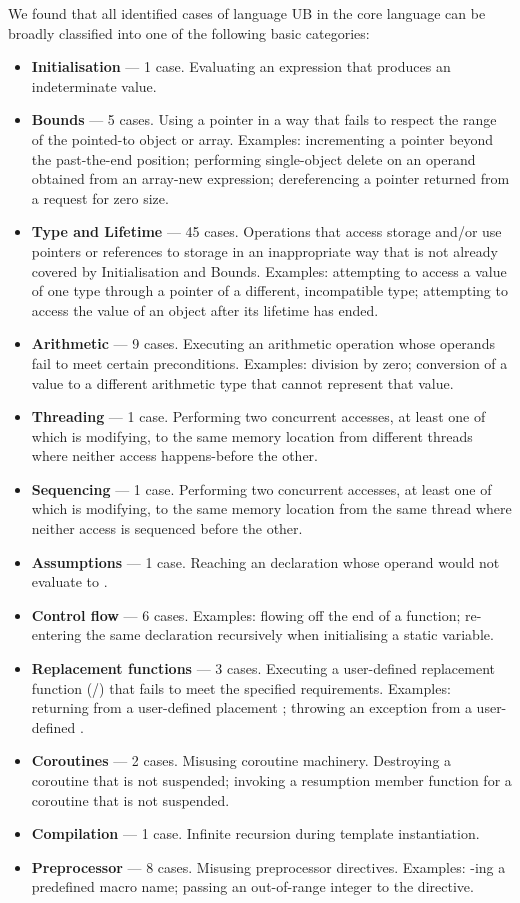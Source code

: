 We found that all identified cases of language UB in the core language can be broadly classified into one of the following basic categories:
\begin{itemize}
\item \textbf{Initialisation} --- 1 case. Evaluating an expression that produces an indeterminate value.
\item \textbf{Bounds} --- 5 cases. Using a pointer in a way that fails to respect the range of the pointed-to object or array. Examples: incrementing a pointer beyond the past-the-end position; performing single-object delete on an operand obtained from an array-new expression;  dereferencing a pointer returned from a request for zero size.
\item \textbf{Type and Lifetime} --- 45 cases. Operations that access storage and/or use pointers or references to storage in an inappropriate way that is not already covered by Initialisation and Bounds. Examples: attempting to access a value of one type through  a pointer of a different, incompatible type; attempting to access the value of an object after its lifetime has ended. 
\item \textbf{Arithmetic} --- 9 cases. Executing an arithmetic operation whose operands fail to meet certain preconditions. Examples: division by zero; conversion of a value to a different arithmetic type that cannot represent that value. 
\item \textbf{Threading} --- 1 case. Performing two concurrent accesses, at least one of which is modifying, to the same memory location from different threads where neither access happens-before the other.
\item \textbf{Sequencing} --- 1 case. Performing two concurrent accesses, at least one of which is modifying, to the same memory location from the same thread where neither access is sequenced before the other.
\item \textbf{Assumptions} --- 1 case. Reaching an \tcode{[[assume]]} declaration whose operand would not evaluate to .
\item \textbf{Control flow} --- 6 cases. Examples: flowing off the end of a function; re-entering the same declaration recursively when initialising a static variable.
\item \textbf{Replacement functions} --- 3 cases. Executing a user-defined replacement function (/) that fails to meet the specified requirements. Examples: returning  from a user-defined placement ; throwing an exception from a user-defined .
\item \textbf{Coroutines} --- 2 cases. Misusing coroutine machinery. Destroying a coroutine that is not suspended; invoking a resumption member function for a coroutine that is not suspended.
\item \textbf{Compilation} --- 1 case. Infinite recursion during template instantiation.
\item \textbf{Preprocessor} --- 8 cases. Misusing preprocessor directives. Examples: -ing a predefined macro name; passing an out-of-range integer to the  directive.
\end{itemize}

